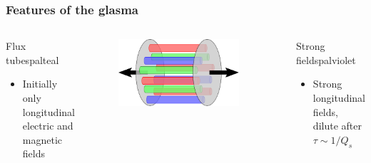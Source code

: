 \documentclass[aspectratio=169,11pt,usenames,dvipsnames]{beamer}
\begin{document}

\begin{frame}
    \frametitle{Features of the glasma}
    \begin{columns}[onlytextwidth,t]

        \begin{custombox2}{{\normalsize Flux tubes}}{palteal}
            \begin{varwidth}{0.99\columnwidth}
            \begin{itemize}\itemsep0em 
                \scriptsize
                \item Initially only longitudinal electric and magnetic fields
            \end{itemize}
            \end{varwidth}
        \end{custombox2}

        \vspace{5pt}
        \begin{center}
            \begin{figure}
                \centering
                \hspace{-5pt}\includegraphics[width=0.9\textwidth]{images/glasma.eps}
            \end{figure}
        \end{center}

       \begin{custombox2}{{\normalsize Strong fields}}{palviolet}
            \begin{varwidth}{0.95\columnwidth}
            \begin{itemize}\itemsep0em 
                \scriptsize
                \item Strong longitudinal fields, dilute after $\tau\sim 1/Q_s$
            \end{itemize}
            \end{varwidth}
        \end{custombox2}
        

\end{columns}
\end{frame}
\end{document}
